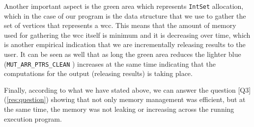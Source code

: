 Another important aspect is the green area which represents \texttt{IntSet} allocation, which in the case of our program is the data structure that we use to gather the set of vertices that represents a \acrshort{wcc}. This means that the amount of memory used for gathering the \acrshort{wcc} itself is minimum and it is decreasing over time, which is another empirical indication that we are incrementally releasing results to the user. It can be seen as well that as long the green area reduces the lighter blue (\texttt{MUT_ARR_PTRS_CLEAN} \cite{ghcheap}) increases at the same time indicating that the computations for the output (releasing results) is taking place. 

Finally, according to what we have stated above, we can answer the question [Q3] (\autoref{res:question}) showing that not only memory management was efficient, but at the same time, the memory was not leaking or increasing across the running execution program.
  
  
  